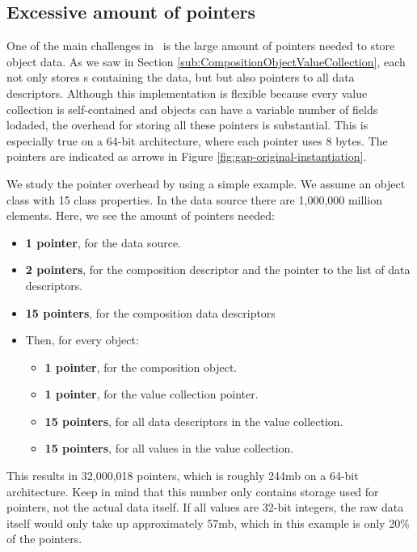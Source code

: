 \subsection{Excessive amount of pointers}
\label{sub:Excessive amount of pointers}
One of the main challenges in \gap~is the large amount of pointers needed to store object data. As we saw in Section \ref{sub:CompositionObjectValueCollection}, each  not only stores s containing the data, but but also pointers to all data descriptors. Although this implementation is flexible because every value collection is self-contained and objects can have a variable number of fields lodaded, the overhead for storing all these pointers is substantial. This is especially true on a 64-bit architecture, where each pointer uses 8 bytes. The pointers are indicated as arrows in Figure \ref{fig:gap-original-instantiation}.

We study the pointer overhead by using a simple example. We assume an object class with 15 class properties. In the data source there are 1,000,000 million elements. Here, we see the amount of pointers needed:
\begin{itemize}
    \item \textbf{1 pointer}, for the data source.
    \item \textbf{2 pointers}, for the composition descriptor and the pointer to the list of data descriptors.
    \item \textbf{15 pointers}, for the composition data descriptors
    \item Then, for every object:
    \begin{itemize}
        \item \textbf{1 pointer}, for the composition object.
        \item \textbf{1 pointer}, for the value collection pointer.
        \item \textbf{15 pointers}, for all data descriptors in the value collection.
        \item \textbf{15 pointers}, for all values in the value collection.
    \end{itemize}
\end{itemize}
This results in 32,000,018 pointers, which is roughly 244mb on a 64-bit architecture. Keep in mind that this number only contains storage used for pointers, not the actual data itself. If all values are 32-bit integers, the raw data itself would only take up approximately 57mb, which in this example is only 20\% of the pointers.

